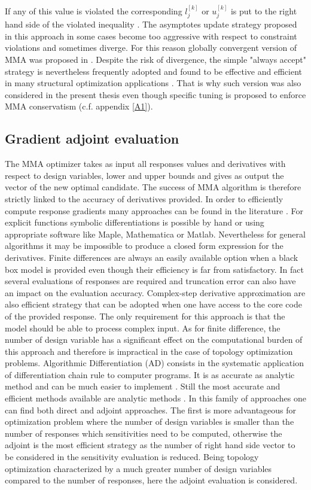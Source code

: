 If any of this value is violated the corresponding $l_j^{[k]}$ or $u_j^{[k]}$ is put to the right hand side of the violated inequality \cite{svanberg2007mma}.
The asymptotes update strategy proposed in this approach in some cases become too aggressive with respect to constraint violations and sometimes diverge. For this reason globally convergent version of MMA was proposed in \cite{svanberg2002class}. Despite the risk of divergence, the simple "always accept" strategy is nevertheless frequently adopted and found to
be effective and efficient in many structural optimization applications \cite{groenwold2010conditional}. That is why such version was also considered in the present thesis even though specific tuning is proposed to enforce MMA conservatism (c.f. appendix \ref{A1}).
\subsection{Gradient adjoint evaluation}
 The MMA optimizer  takes as input all responses values and derivatives with respect to design variables, lower and upper bounds and gives as output the vector of the new optimal candidate. The success of MMA algorithm is therefore strictly linked to the accuracy of derivatives provided. 
 In order to efficiently compute response gradients many approaches can be found in the literature \cite{van2005review}\cite{martins2012short}. For explicit functions symbolic differentiations is possible by hand or using appropriate software like Maple, Mathematica or Matlab. Nevertheless for general algorithms it may be impossible to produce a closed form expression for the derivatives. 
 Finite differences are always an easily available option when a black box model is provided even though their efficiency is far from satisfactory. In fact several evaluations of responses are required and truncation error can also have an impact on the evaluation accuracy. Complex-step derivative approximation \cite{lyness1967numerical} are also efficient strategy that can be adopted when one have access to the core code of the provided response. The only requirement for this approach is that the model should be able to process complex input. As for finite difference, the number of design variable has a significant effect on the computational burden of this approach and therefore is impractical in the case of topology optimization problems. Algorithmic Differentiation (AD) \cite{griewank2000evaluating,naumann2012art} consists in the systematic application of differentiation chain rule to computer programs. It is as accurate as analytic method and can be much easier to implement \cite{martins2012short}. Still the most accurate and efficient methods available are analytic methods \cite{martins2012short}. In this family of approaches one can find both direct and adjoint approaches. The first is more advantageous for optimization problem where the number of design variables is smaller than the number of responses which sensitivities need to be computed, otherwise the adjoint is the most efficient strategy as the number of right hand side vector to be considered in the sensitivity evaluation is reduced. Being topology optimization characterized by a much greater number of design variables compared to the number of responses, here the adjoint evaluation is considered. 
